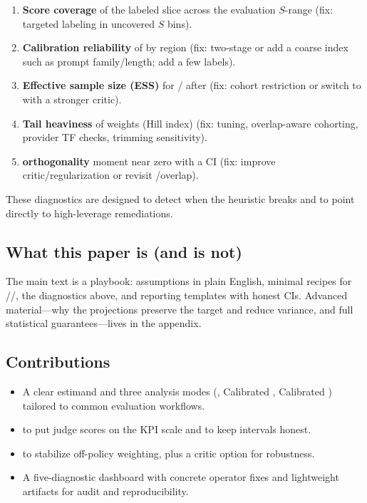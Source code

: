 \begin{enumerate}[label=(\alph*)]
\item \textbf{Score coverage} of the labeled slice across the evaluation $S$-range (fix: targeted labeling in uncovered $S$ bins).

\item \textbf{Calibration reliability} of \autocal{} by region (fix: two-stage \autocal{} or add a coarse index such as prompt family/length; add a few labels).

\item \textbf{Effective sample size (ESS)} for \ips/\dr{} after \simcal{} (fix: cohort restriction or switch to \dr{} with a stronger critic).

\item \textbf{Tail heaviness} of weights (Hill index) (fix: \simcal{} tuning, overlap-aware cohorting, provider TF checks, trimming sensitivity).

\item \textbf{\dr{} orthogonality} moment near zero with a CI (fix: improve critic/regularization or revisit \simcal/overlap).
\end{enumerate}

These diagnostics are designed to detect when the heuristic breaks and to point directly to high-leverage remediations.

\subsection{What this paper is (and is not)}

The main text is a playbook: assumptions in plain English, minimal recipes for \dm/\ips/\dr, the diagnostics above, and reporting templates with honest CIs. Advanced material---why the projections preserve the target and reduce variance, and full statistical guarantees---lives in the appendix.

\subsection{Contributions}

\begin{itemize}
\item A clear estimand and three analysis modes (\dm, Calibrated \ips, Calibrated \dr) tailored to common evaluation workflows.

\item \autocal{} to put judge scores on the KPI scale and \oua{} to keep intervals honest.

\item \simcal{} to stabilize off-policy weighting, plus a critic option for \dr{} robustness.

\item A five-diagnostic dashboard with concrete operator fixes and lightweight artifacts for audit and reproducibility.
\end{itemize}

